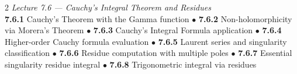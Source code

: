 \begin{multicols}{2}
\medskip
\noindent\textit{Lecture 7.6 --- Cauchy's Integral Theorem and Residues}\\
\textbf{7.6.1} Cauchy's Theorem with the Gamma function \(\bullet\)
\textbf{7.6.2} Non-holomorphicity via Morera's Theorem \(\bullet\)
\textbf{7.6.3} Cauchy's Integral Formula application \(\bullet\)
\textbf{7.6.4} Higher-order Cauchy formula evaluation \(\bullet\)
\textbf{7.6.5} Laurent series and singularity classification \(\bullet\)
\textbf{7.6.6} Residue computation with multiple poles \(\bullet\)
\textbf{7.6.7} Essential singularity residue integral \(\bullet\)
\textbf{7.6.8} Trigonometric integral via residues
\end{multicols}
